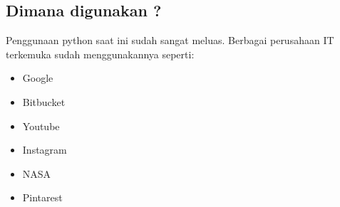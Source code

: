 \subsection{Dimana digunakan ?}
Penggunaan python saat ini sudah sangat meluas. Berbagai perusahaan IT terkemuka sudah menggunakannya seperti:
\begin{itemize}
    \item  Google
    \item  Bitbucket
    \item  Youtube
    \item  Instagram
    \item  NASA
    \item  Pintarest
\end{itemize}
\newpage 

